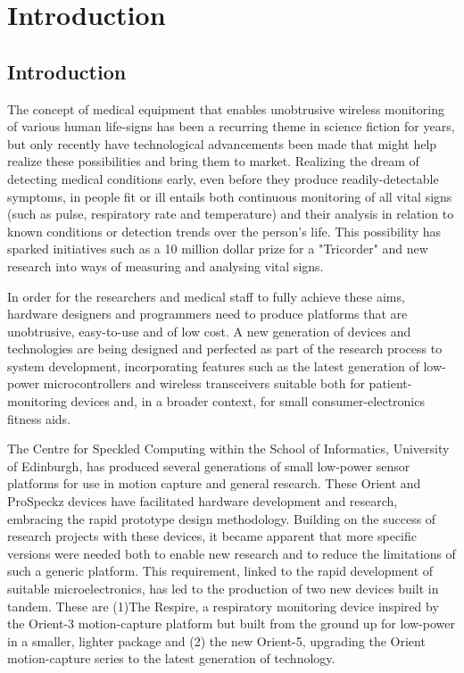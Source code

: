 
\chapter{Introduction}

\section{Introduction}

The concept of medical equipment that enables unobtrusive wireless monitoring of various human
life-signs has been a recurring theme in science fiction for years\cite{StarTrekStarFleetTechnicalManual1986}, but only recently have
technological advancements been made that might help realize these possibilities and bring them to
market. Realizing the dream of detecting medical conditions early, even before they produce readily-detectable
symptoms, in people fit or ill entails both continuous monitoring of all vital signs (such as
pulse, respiratory rate and temperature) and their analysis in relation to known conditions or
detection trends over the person’s life. This possibility has sparked initiatives such as a 10 million
dollar prize for a "Tricorder"\cite{XprizeHealth2012} and new research into ways of measuring and analysing vital
signs.


In order for the researchers and medical staff to fully achieve these aims, hardware designers and
programmers need to produce platforms that are unobtrusive, easy-to-use and of low cost. A new
generation of devices and technologies are being designed and perfected as part of the research
process to system development, incorporating features such as the latest generation of low-power
microcontrollers and wireless transceivers suitable both for patient-monitoring devices
and, in a broader context, for small  consumer-electronics fitness aids\cite{Jawbone2012, Fitbit2012}.


The Centre for Speckled Computing within the School of Informatics, University of
Edinburgh, has produced several generations of small low-power sensor platforms for use
in motion capture and general research. These Orient\cite{Orient2012} and ProSpeckz\cite{ProSpeckz2012} devices
have facilitated hardware development and research, embracing the rapid prototype
design methodology. Building on the success of research projects with these devices, it
became apparent that more specific versions were needed both to enable new research and to
reduce the limitations of such a generic platform. This requirement, linked to the rapid development
of suitable microelectronics, has led to the production of two new devices built in tandem. These are
(1)The Respire, a respiratory monitoring device inspired by the Orient-3 motion-capture platform
but built from the ground up for low-power in a smaller, lighter package and (2) the new Orient-5,
upgrading the Orient motion-capture series to the latest generation of technology.

